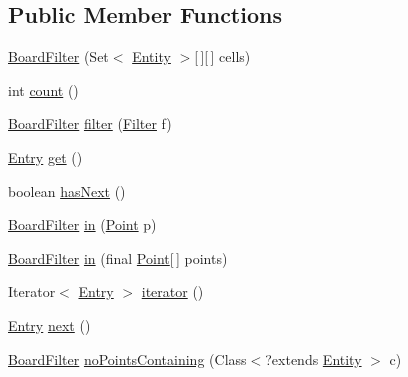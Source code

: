 \subsection*{Public Member Functions}
\begin{DoxyCompactItemize}
\item 
\hyperlink{classjdungeon_1_1core_1_1world_1_1filter_1_1_board_filter_aea942872bd0903713f627e0ac46d610d}{BoardFilter} (Set$<$ \hyperlink{classjdungeon_1_1core_1_1world_1_1_entity}{Entity} $>$\mbox{[}$\,$\mbox{]}\mbox{[}$\,$\mbox{]} cells)
\item 
int \hyperlink{classjdungeon_1_1core_1_1world_1_1filter_1_1_board_filter_a59b85b4ccb3ea7ac499a479d7661a50d}{count} ()
\item 
\hyperlink{classjdungeon_1_1core_1_1world_1_1filter_1_1_board_filter}{BoardFilter} \hyperlink{classjdungeon_1_1core_1_1world_1_1filter_1_1_board_filter_af6a5d5295f6dba33edd9726fb0c373e1}{filter} (\hyperlink{interfacejdungeon_1_1core_1_1world_1_1filter_1_1_filter}{Filter} f)
\item 
\hyperlink{classjdungeon_1_1core_1_1world_1_1filter_1_1_entry}{Entry} \hyperlink{classjdungeon_1_1core_1_1world_1_1filter_1_1_board_filter_a6a1ab6e8ed21b6e8bc5b273eb8a2bbe4}{get} ()
\item 
boolean \hyperlink{classjdungeon_1_1core_1_1world_1_1filter_1_1_board_filter_a2372e6319091ce3f11f66cd45433dbd4}{hasNext} ()
\item 
\hyperlink{classjdungeon_1_1core_1_1world_1_1filter_1_1_board_filter}{BoardFilter} \hyperlink{classjdungeon_1_1core_1_1world_1_1filter_1_1_board_filter_a5485fd51972c254b8f30a2ae4e85adf2}{in} (\hyperlink{classjdungeon_1_1core_1_1world_1_1_point}{Point} p)
\item 
\hyperlink{classjdungeon_1_1core_1_1world_1_1filter_1_1_board_filter}{BoardFilter} \hyperlink{classjdungeon_1_1core_1_1world_1_1filter_1_1_board_filter_a8605362019791db0f880d5b1a44a2b3d}{in} (final \hyperlink{classjdungeon_1_1core_1_1world_1_1_point}{Point}\mbox{[}$\,$\mbox{]} points)
\item 
Iterator$<$ \hyperlink{classjdungeon_1_1core_1_1world_1_1filter_1_1_entry}{Entry} $>$ \hyperlink{classjdungeon_1_1core_1_1world_1_1filter_1_1_board_filter_a5df90a9fa110d7f1816edba595a5fdb3}{iterator} ()
\item 
\hyperlink{classjdungeon_1_1core_1_1world_1_1filter_1_1_entry}{Entry} \hyperlink{classjdungeon_1_1core_1_1world_1_1filter_1_1_board_filter_a9ab4341c96ae8dc429be4529e8fa76ff}{next} ()
\item 
\hyperlink{classjdungeon_1_1core_1_1world_1_1filter_1_1_board_filter}{BoardFilter} \hyperlink{classjdungeon_1_1core_1_1world_1_1filter_1_1_board_filter_a19d29f8693c5eb64c196b1eecb8b8de4}{noPointsContaining} (Class$<$?extends \hyperlink{classjdungeon_1_1core_1_1world_1_1_entity}{Entity} $>$ c)

\end{DoxyCompactItemize}
